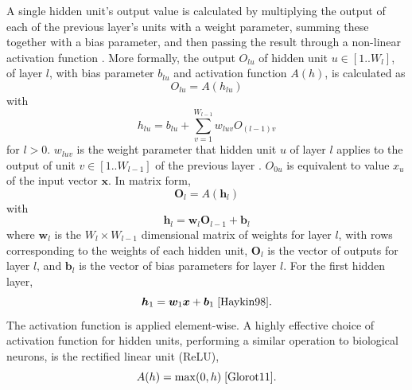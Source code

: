 \documentclass[12pt]{article}
\begin{document}
A single hidden unit's output value is calculated by multiplying the output of each of the previous layer's units with a weight parameter, summing these together with a bias parameter, and then passing the result through a non-linear activation function \cite{Rumelhart86}. More formally, the output $O_{lu}$ of hidden unit $u\in[1..W_l]$, of layer $l$, with bias parameter $b_{lu}$ and activation function $A(h)$, is calculated as
\begin{equation}
O_{lu}=A(h_{lu})
\end{equation}
with
\begin{equation}
h_{lu}=b_{lu}+\sum_{v=1}^{W_{l-1}}w_{luv}O_{(l-1)v}
\end{equation}
for $l > 0$. $w_{luv}$ is the weight parameter that hidden unit $u$ of layer $l$ applies to the output of unit $v\in[1..W_{l-1}]$ of the previous layer \cite{Haykin98}. $O_{0u}$ is equivalent to value $x_u$ of the input vector $\bm{x}$. In matrix form,
\begin{equation}
\bm{O}_l=A(\bm{h}_l)
\end{equation}
with
\begin{equation}
\bm{h}_l=\bm{w}_l\bm{O}_{l-1}+\bm{b}_l
\end{equation}
where $\bm{w}_l$ is the $W_l \times W_{l-1}$ dimensional matrix of weights for layer $l$, with rows corresponding to the weights of each hidden unit, $\bm{O}_l$ is the vector of outputs for layer $l$, and $\bm{b}_l$ is the vector of bias parameters for layer $l$. For the first hidden layer,
\begin{equation}
\bm{h}_1=\bm{w}_1\bm{x}+\bm{b}_1\; \cite{Haykin98}.
\end{equation}
The activation function is applied element-wise. A highly effective choice of activation function for hidden units, performing a similar operation to biological neurons, is the rectified linear unit (ReLU),
\begin{equation}
A(h)=\mathrm{max}(0,h)\; \cite{Glorot11}.
\end{equation}
\end{document}
